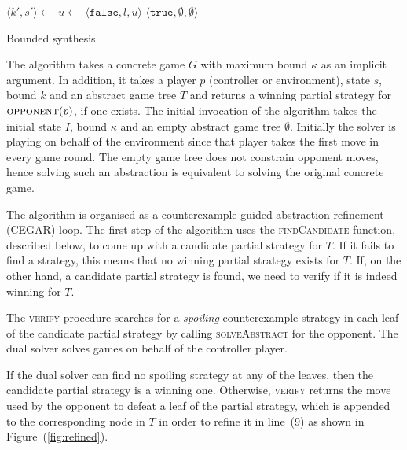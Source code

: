 \documentclass{llncs}
\newcommand{\True}{\texttt{true}}
\newcommand{\False}{\texttt{false}}
\begin{document}
\begin{algorithm}[t]
    \begin{algorithmic}
            \State $\langle k', s'\rangle \gets $  
                \State $u \gets $  
                 \Return $\langle \False, l, u \rangle$ \EndIIf {}
            \EndFor
            \State \Return $\langle \True, \emptyset, \emptyset \rangle$
        \EndFunction
    \end{algorithmic}

    \caption{Bounded synthesis}
    \label{alg:bounded}
\end{algorithm}

The algorithm takes a concrete game $G$ with maximum bound $\kappa$ as an implicit
argument.  In addition, it takes a player $p$ (controller or environment),
state $s$, bound $k$ and an abstract game tree $T$ and returns a winning
partial strategy for $\textsc{opponent}(p)$, if one exists.  The initial
invocation of the algorithm takes the initial state $I$, bound $\kappa$ and an
empty abstract game tree $\emptyset$.  Initially the solver is playing on
behalf of the environment since that player takes the first move in every game
round.  The empty game tree does not constrain opponent moves, hence solving
such an abstraction is equivalent to solving the original concrete game.

The algorithm is organised as a counterexample-guided abstraction refinement
(CEGAR) loop.  The first step of the algorithm uses the \textsc{findCandidate}
function, described below, to come up with a candidate partial strategy for
$T$. If it fails to find a strategy, this means that no winning partial
strategy exists for $T$.  If, on the other hand, a candidate partial strategy
is found, we need to verify if it is indeed winning for $T$.

The \textsc{verify} procedure searches for a \emph{spoiling} counterexample
strategy in each leaf of the candidate partial strategy by calling
\textsc{solveAbstract} for the opponent. The dual solver solves games on behalf
of the controller player.  

If the dual solver can find no spoiling strategy at any of the leaves, then the
candidate partial strategy is a winning one. Otherwise, \textsc{verify} returns
the move used by the opponent to defeat a leaf of the partial strategy, which
is appended to the corresponding node in $T$ in order to refine it in line~(9)
as shown in Figure~(\ref{fig:refined}).
\end{document}
